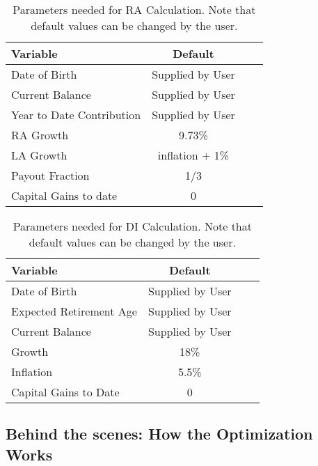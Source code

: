 \documentclass[a4paper, justified]{tufte-handout}
\begin{document}
\begin{table}[bt]
	\centering
	\caption{Parameters needed for RA Calculation. Note that default values can be changed by the user.}
	\label{tab:RAParameters}
	\begin{tabular}{lccc}
		\toprule
		\textbf{Variable} 												& \textbf{Default} \\ 
		\midrule
		Date of Birth 										&  Supplied by User\\ 
		Current Balance 								&  Supplied by User\\ 
		Year to Date Contribution							&  Supplied by User\\ 
		RA Growth						&  9.73\%\\ 
		LA Growth	&  inflation + 1\%\\ 
		Payout Fraction									&1/3\\
		Capital Gains to date & 0\\
		\bottomrule
	\end{tabular}
\end{table}

\begin{table}[b]
	\centering
	\caption{Parameters needed for DI Calculation. Note that default values can be changed by the user.}
	\label{tab:DIParameters}
	\begin{tabular}{lccc}
		\toprule
		\textbf{Variable} 												& \textbf{Default} \\ 
		\midrule
		Date of Birth 										&  Supplied by User\\ 
		Expected Retirement Age 				& Supplied by User\\
		Current Balance								&  Supplied by User\\ 
		Growth						&  18\%\\ 
		Inflation									&5.5\%\\
		Capital Gains to Date & 0\\
		\bottomrule
	\end{tabular}
\end{table}

\subsection{Behind  the scenes: How the Optimization Works}
\end{document}
